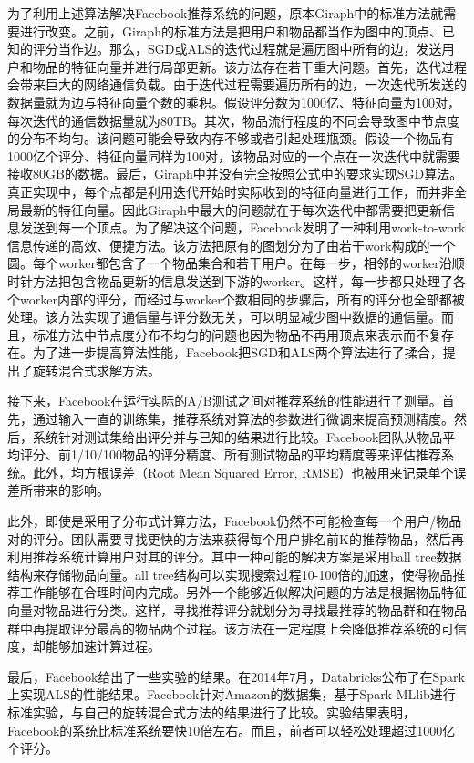 	为了利用上述算法解决Facebook推荐系统的问题，原本Giraph中的标准方法就需要进行改变。之前，Giraph的标准方法是把用户和物品都当作为图中的顶点、已知的评分当作边。那么，SGD或ALS的迭代过程就是遍历图中所有的边，发送用户和物品的特征向量并进行局部更新。该方法存在若干重大问题。首先，迭代过程会带来巨大的网络通信负载。由于迭代过程需要遍历所有的边，一次迭代所发送的数据量就为边与特征向量个数的乘积。假设评分数为1000亿、特征向量为100对，每次迭代的通信数据量就为80TB。其次，物品流行程度的不同会导致图中节点度的分布不均匀。该问题可能会导致内存不够或者引起处理瓶颈。假设一个物品有1000亿个评分、特征向量同样为100对，该物品对应的一个点在一次迭代中就需要接收80GB的数据。最后，Giraph中并没有完全按照公式中的要求实现SGD算法。真正实现中，每个点都是利用迭代开始时实际收到的特征向量进行工作，而并非全局最新的特征向量。因此Giraph中最大的问题就在于每次迭代中都需要把更新信息发送到每一个顶点。为了解决这个问题，Facebook发明了一种利用work-to-work信息传递的高效、便捷方法。该方法把原有的图划分为了由若干work构成的一个圆。每个worker都包含了一个物品集合和若干用户。在每一步，相邻的worker沿顺时针方法把包含物品更新的信息发送到下游的worker。这样，每一步都只处理了各个worker内部的评分，而经过与worker个数相同的步骤后，所有的评分也全部都被处理。该方法实现了通信量与评分数无关，可以明显减少图中数据的通信量。而且，标准方法中节点度分布不均匀的问题也因为物品不再用顶点来表示而不复存在。为了进一步提高算法性能，Facebook把SGD和ALS两个算法进行了揉合，提出了旋转混合式求解方法。

	接下来，Facebook在运行实际的A/B测试之间对推荐系统的性能进行了测量。首先，通过输入一直的训练集，推荐系统对算法的参数进行微调来提高预测精度。然后，系统针对测试集给出评分并与已知的结果进行比较。Facebook团队从物品平均评分、前1/10/100物品的评分精度、所有测试物品的平均精度等来评估推荐系统。此外，均方根误差（Root Mean Squared Error, RMSE）也被用来记录单个误差所带来的影响。

	此外，即使是采用了分布式计算方法，Facebook仍然不可能检查每一个用户/物品对的评分。团队需要寻找更快的方法来获得每个用户排名前K的推荐物品，然后再利用推荐系统计算用户对其的评分。其中一种可能的解决方案是采用ball tree数据结构来存储物品向量。all tree结构可以实现搜索过程10-100倍的加速，使得物品推荐工作能够在合理时间内完成。另外一个能够近似解决问题的方法是根据物品特征向量对物品进行分类。这样，寻找推荐评分就划分为寻找最推荐的物品群和在物品群中再提取评分最高的物品两个过程。该方法在一定程度上会降低推荐系统的可信度，却能够加速计算过程。

	最后，Facebook给出了一些实验的结果。在2014年7月，Databricks公布了在Spark上实现ALS的性能结果。Facebook针对Amazon的数据集，基于Spark MLlib进行标准实验，与自己的旋转混合式方法的结果进行了比较。实验结果表明，Facebook的系统比标准系统要快10倍左右。而且，前者可以轻松处理超过1000亿个评分。
